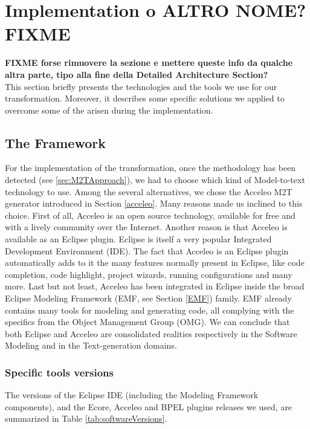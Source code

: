 \section{Implementation o ALTRO NOME? FIXME }
\label{sec:TheFramework}
\textbf{FIXME forse rimuovere la sezione e mettere queste info da qualche altra parte, tipo alla fine della Detailed Architecture Section?} \\
This section briefly presents the technologies and the tools we use for our transformation. Moreover, it describes some specific solutions we applied to overcome some of the arisen during the implementation.

\subsection{The Framework}
\label{framework}
For the implementation of the transformation, once the methodology has been detected (see \ref{sec:M2TApproach}), we had to choose which kind of Model-to-text technology to use. Among the several alternatives, we chose the Acceleo M2T generator introduced in Section \ref{acceleo}.
Many reasons made us inclined to this choice. 
First of all, Acceleo is an open source technology, available for free and with a lively community over the Internet. Another reason is that Acceleo is available as an Eclipse plugin. Eclipse is itself a very popular Integrated Development Environment (IDE). The fact that Acceleo is an Eclipse plugin automatically adds to it the many features normally present in Eclipse, like code completion, code highlight, project wizards, running configurations and many more. 
Last but not least, Acceleo has been integrated in Eclipse inside the broad Eclipse Modeling Framework (EMF, see Section \ref{EMF}) family. EMF already contains many tools for modeling and generating code, all complying with the specifics from the Object Management Group (OMG).
We can conclude that both Eclipse and Acceleo are consolidated realities respectively in the Software Modeling and in the Text-generation domains. 
\subsubsection{Specific tools versions}
\label{sec:specificTools}
The versions of the Eclipse IDE (including the Modeling Framework components), and the Ecore, Acceleo and BPEL plugins releases we used, are summarized in Table \ref{tab:softwareVersions}.

